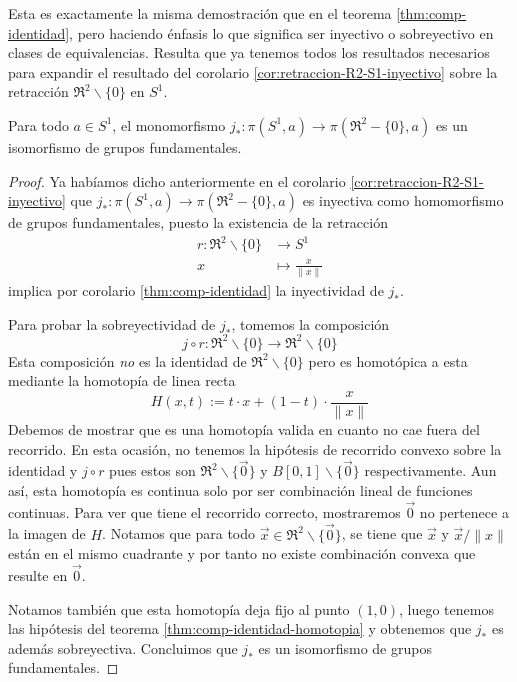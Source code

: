 Esta es exactamente la misma demostración que en el teorema
\ref{thm:comp-identidad}, pero haciendo énfasis lo que significa ser
inyectivo o sobreyectivo en clases de equivalencias. Resulta que ya
tenemos todos los resultados necesarios para expandir el resultado del
corolario \ref{cor:retraccion-R2-S1-inyectivo} sobre la
retracción \(\Re ^2 \backslash \{0\}\) en \(S^1\).

\begin{teorema}
  Para todo \(a \in S^1\), el monomorfismo \(j_* : \pi (S^1, a)
  \to \pi (\Re ^2 - \{0\}, a)\) es un isomorfismo de grupos
  fundamentales.
\end{teorema}
\begin{proof}
  Ya habíamos dicho anteriormente en el corolario
  \ref{cor:retraccion-R2-S1-inyectivo} que \( j_* : \pi (S^1, a) \to \pi
  (\Re ^2 - \{0\}, a)\) es inyectiva como homomorfismo de grupos
  fundamentales, puesto la existencia de la retracción
  \begin{align*}
    r : \Re ^2 \backslash \{0\} &\longrightarrow S^1 \\
    x &\longmapsto \frac x {\lVert x \rVert}
  \end{align*}
  implica por corolario \ref{thm:comp-identidad} la inyectividad de
  \(j_*\).

  Para probar la sobreyectividad de \(j_*\), tomemos la composición
  \[ j \circ r : \Re ^2 \backslash \{0\} \longrightarrow \Re ^2
      \backslash \{0\} \]
    Esta composición \emph{no} es la identidad de \(\Re ^2 \backslash \{0\}
  \) pero es homotópica a esta mediante la homotopía de linea recta
  \[
    H(x,t) := t \cdot x + (1 - t) \cdot \frac x {\lVert x \rVert}
  \]
  Debemos de mostrar que es una homotopía valida en cuanto no cae fuera
  del recorrido. En esta ocasión, no tenemos la hipótesis de recorrido
  convexo sobre la identidad y \(j \circ r\) pues estos son \(\Re ^2
  \backslash \{\vec 0\}\) y \(B[0,1] \backslash \{\vec 0\}\)
  respectivamente. Aun así, esta homotopía es continua solo por ser
  combinación lineal de funciones continuas. Para ver que tiene el
  recorrido correcto, mostraremos \(\vec 0\) no pertenece a la imagen de
  \(H\). Notamos que para todo \(\vec x \in \Re ^2 \backslash \{\vec
  0\}\), se tiene que \(\vec x \) y \( \vec x / \lVert x \rVert\) están en
  el mismo cuadrante y por tanto no existe combinación convexa que resulte
  en \(\vec 0\).

  Notamos también que esta homotopía deja fijo al punto \((1,0)\), luego
  tenemos las hipótesis del teorema \ref{thm:comp-identidad-homotopia} y
  obtenemos que \(j_*\) es además sobreyectiva. Concluimos que \(j_*\) es
  un isomorfismo de grupos fundamentales.
\end{proof}

